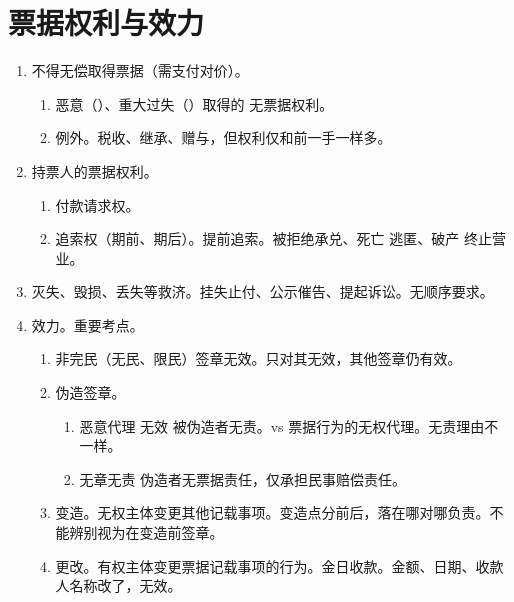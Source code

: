 \section{票据权利与效力}
\begin{enumerate}
  \item 不得无偿取得票据（需支付对价）。
        \begin{enumerate}
          \item 恶意（）、重大过失（）取得的 \yjt 无票据权利。
          \item 例外。税收、继承、赠与，但权利仅和前一手一样多。
        \end{enumerate}
  \item 持票人的票据权利。
        \begin{enumerate}
          \item 付款请求权。
          \item 追索权（期前、期后）。提前追索。被拒绝承兑、死亡 \hz 逃匿、破产 \hz 终止营业。
        \end{enumerate}
  \item 灭失、毁损、丢失等救济。挂失止付、公示催告、提起诉讼。无顺序要求。
  \item 效力。重要考点。
        \begin{enumerate}
          \item 非完民（无民、限民）签章无效。只对其无效，其他签章仍有效。
          \item 伪造签章。
                \begin{enumerate}
                  \item 恶意代理 \yjt 无效 \yjt 被伪造者无责。vs 票据行为的无权代理。无责理由不一样。
                  \item 无章无责 \yjt 伪造者无票据责任，仅承担民事赔偿责任。
                \end{enumerate}
          \item 变造。无权主体变更其他记载事项。变造点分前后，落在哪对哪负责。不能辨别视为在变造前签章。
          \item 更改。有权主体变更票据记载事项的行为。金日收款。金额、日期、收款人名称改了，无效。
        \end{enumerate}
\end{enumerate}
